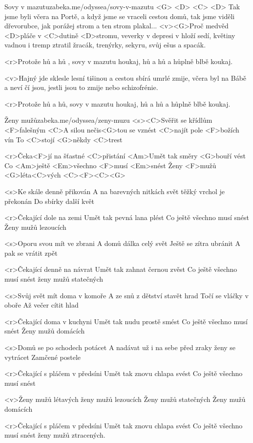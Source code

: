 \begin{song}{56}{Sovy v mazutu}{zabeka.me/odyssea/sovy-v-mazutu}
	<G> <D> <C> <D>
	Tak jsme byli včera na Portě, a když jsme se vraceli cestou domů,
	tak jsme viděli dřevorubce, jak porážej strom a ten strom plakal...
	<v><G>Proč medvěd <D>pláče v <C>dutině <D>stromu, veverky v depresi v hloží sedí,
	květiny vadnou i tremp ztratil žracák, trenýrky, sekyru, svůj ešus a spacák.

	<r>Protože hů a hů , sovy v mazutu houkaj,
	hů a hů a hůplně blbě koukaj.

	<v>Hajný jde sklesle lesní tišinou a cestou sbírá umrlé zmije,
	včera byl na Bábě a neví čí jsou, jestli jsou to zmije nebo schizofrénie.

	<r>Protože hů a hů, sovy v mazutu houkaj,
	hů a hů a hůplně blbě koukaj.
\end{song}
\begin{song}[Epydemye]{57}{Ženy mužů}{zabeka.me/odyssea/zeny-muzu}
	<s><C>Svěřit se křídlům <F>falešným
	<C>A silou nečis<G>tou se vznést
	<C>najít pole <F>božích vín
	To <C>stojí <G>někdy <C>trest

	<r>Čeka<F>jí na šťastné <C>přistání
	<Am>Umět tak směry <G>bouří vést
	Co <Am>ještě <Em>všechno <F>musí <Em>snést
	Ženy <F>mužů <G>léta<C>vých <C><F><C><G>

	<s>Ke skále denně přikován
	A na barevných nitkách svět
	těžký vrchol je překonán
	Do sbírky další květ

	<r>Čekající dole na zemi
	Umět tak pevná lana plést
	Co ještě všechno musí snést
	Ženy mužů lezoucích

	<s>Oporu svou mít ve zbrani
	A domů dálka celý svět
	Ještě se zítra ubránit
	A pak se vrátit zpět

	<r>Čekající denně na návrat
	Umět tak zahnat černou zvěst
	Co ještě všechno musí snést
	ženy mužů statečných

	<s>Svůj svět mít doma v komoře
	A ze snů z dětství stavět hrad
	Točí se vláčky v oboře
	Až večer cítit hlad

	<r>Čekající doma v kuchyni
	Umět tak nudu prostě smést
	Co ještě všechno musí snést
	Ženy mužů domácích

	<s>Domů se po schodech potácet
	A nadávat už i na sebe
	před zraky ženy se vytrácet
	Zamčené postele

	<r>Čekající s pláčem v předsíni
	Umět tak znovu chlapa svést
	Co ještě všechno musí snést

	<v>Ženy mužů létavých
	ženy mužů lezoucích
	Ženy mužů statečných
	Ženy mužů domácích

	<r>Čekající s pláčem v předsíni
	Umět tak znovu chlapa svést
	Co ještě všechno musí snést
	ženy mužů ztracených.
\end{song}
